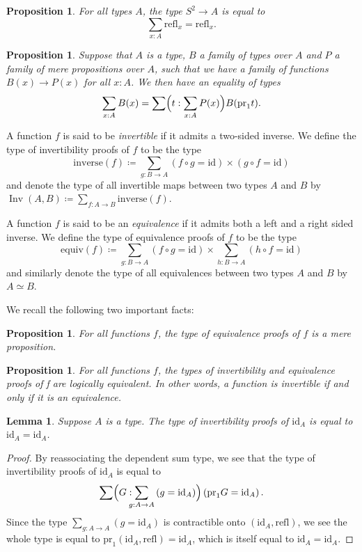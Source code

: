 \documentclass{article}
\theoremstyle{definition}
\theoremstyle{plain}
\newtheorem{proposition}[theorem]{Proposition}
\newtheorem{lemma}[theorem]{Lemma}
\newcommand{\id}{\mathrm{id}}
\newcommand{\inverse}{\mathrm{inverse}}
\newcommand{\isequiv}{\mathrm{equiv}}
\newcommand{\pr}{\mathrm{pr}}
\newcommand{\refl}{\mathrm{refl}}
\newcommand{\sphere}{S^{2}}
\DeclareMathOperator{\inv}{Inv}
\begin{document}
\begin{proposition}
  \label{universal-property-sphere}
  For all types \(A\), the type \(\sphere \to A\) is equal to
  \[\sum_{x : A} \refl_{x} = \refl_{x}.\]
\end{proposition}
\begin{proposition}
  \label{family-over-subtype}
  Suppose that \(A\) is a type, \(B\) a family of types over \(A\) and \(P\) a family of mere
  propositions over \(A\), such that we have a family of functions \(B(x) \to P(x)\) for all
  \(x : A\). We then have an equality of types
  \[\sum_{x : A}B(x) = \sum \Bigl(t : \sum_{x : A}P(x)\Bigr) B(\pr_{1}t).\]
\end{proposition}

A function \(f\) is said to be \emph{invertible}
if it admits a two-sided inverse.
We define the type of invertibility proofs of \(f\) to be the type
\[\inverse(f) \coloneq \sum_{g : B \to A}(f \circ g = \id) \times (g \circ f = \id)\]
and denote the type of all invertible maps between two types \(A\) and \(B\) by
\(\inv(A, B) \coloneq \sum_{f : A \to B}\inverse(f)\).

A function \(f\) is said to be an \emph{equivalence} if it admits both a left and a
right sided inverse.
We define the type of equivalence proofs of \(f\) to be the type
\[\isequiv(f) \coloneq \sum_{g : B \to A}(f \circ g = \id) \times
  \sum_{h : B \to A}(h \circ f = \id)\]
and similarly denote the type of all equivalences between two types \(A\) and \(B\)
by~\(A \simeq B\).


We recall the following two important facts:
\begin{proposition}
  \label{is-prop-equiv}
  For all functions \(f\), the type of equivalence proofs of \(f\) is a mere proposition.
\end{proposition}

\begin{proposition}
  \label{inv-implies-equiv}
  For all functions \(f\), the types of invertibility and equivalence proofs of f are
  logically equivalent. In other words, a function is invertible if and only if it is
  an equivalence.
\end{proposition}

\begin{lemma}
  \label{inv-id}
  Suppose \(A\) is a type. The type of invertibility proofs of \(\id_{A}\) is equal
  to \(\id_{A} = \id_{A}\).
\end{lemma}

\begin{proof}
  By reassociating the dependent sum type, we see that the type of invertibility proofs of
  \(\id_{A}\) is equal to
  \[\sum \Bigl(G : \hspace{-6pt} \sum_{g : A \to A} \left(g = \id_{A}\right)\Bigr)
    \left( \pr_{1}G = \id_{A}\right).\]
  Since the type \(\sum_{g : A \to A}\left(g = \id_{A}\right)\) is contractible onto
  \(\left(\id_{A}, \refl\right)\), we see the whole type is equal to
  \(\pr_{1}\left(\id_{A}, \refl\right) = \id_{A}\), which is itself equal to
  \(\id_{A} = \id_{A}\).
\end{proof}
\end{document}
